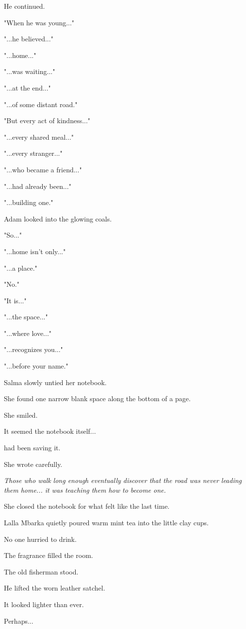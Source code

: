 \documentclass[12pt,openany]{book}
\begin{document}
He continued.

"When he was young..."

"...he believed..."

"...home..."

"...was waiting..."

"...at the end..."

"...of some distant road."

"But every act of kindness..."

"...every shared meal..."

"...every stranger..."

"...who became a friend..."

"...had already been..."

"...building one."

Adam looked into the glowing coals.

"So..."

"...home isn't only..."

"...a place."

"No."

"It is..."

"...the space..."

"...where love..."

"...recognizes you..."

"...before your name."

Salma slowly untied her notebook.

She found one narrow blank space along the bottom of a page.

She smiled.

It seemed the notebook itself...

had been saving it.

She wrote carefully.

\emph{Those who walk long enough eventually discover that the road was never leading them home... it was teaching them how to become one.}

She closed the notebook for what felt like the last time.

Lalla Mbarka quietly poured warm mint tea into the little clay cups.

No one hurried to drink.

The fragrance filled the room.

The old fisherman stood.

He lifted the worn leather satchel.

It looked lighter than ever.

Perhaps...
\end{document}
